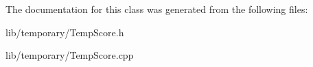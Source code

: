 \-The documentation for this class was generated from the following files\-:\begin{DoxyCompactItemize}
\item 
lib/temporary/\-Temp\-Score.\-h\item 
lib/temporary/\-Temp\-Score.\-cpp\end{DoxyCompactItemize}
